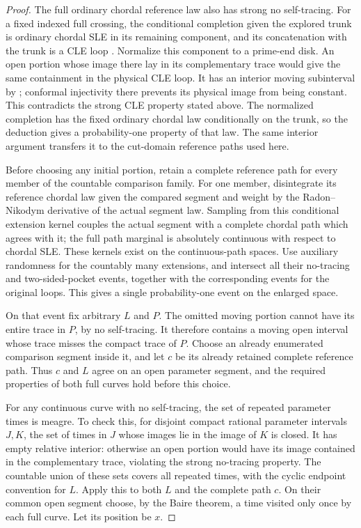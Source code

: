 \begin{proof}
The full ordinary chordal reference law also has strong no self-tracing.
For a fixed indexed full crossing, the conditional completion given
the explored trunk is ordinary chordal SLE in its remaining component,
and its concatenation with the trunk is a CLE loop
\cite[Section~2.3.2]{GwynneMillerQianCLE}.
Normalize this component to a prime-end disk.  An open portion whose
image there lay in its complementary trace would give the same
containment in the physical CLE loop.  It has an interior moving
subinterval by \cite[Proposition~1.7]{YuanLoewnerTraces}; conformal
injectivity there prevents its physical image from being constant.
This contradicts the strong CLE property stated above.  The normalized
completion has the fixed ordinary chordal law conditionally on the
trunk, so the deduction gives a probability-one property of that law.
The same interior argument transfers it to the cut-domain reference
paths used here.

Before choosing any initial portion, retain a complete reference path
for every member of the countable comparison family.  For one member,
disintegrate its reference chordal law given the compared segment and
weight by the Radon--Nikodym derivative of the actual segment law.
Sampling from this conditional extension kernel couples the actual
segment with a complete chordal path which agrees with it; the full
path marginal is absolutely continuous with respect to chordal SLE.
These kernels exist on the continuous-path spaces.  Use auxiliary
randomness for the countably many extensions, and intersect all their
no-tracing and two-sided-pocket events, together with the corresponding
events for the original loops.  This gives a single probability-one
event on the enlarged space.

On that event fix arbitrary $L$ and $P$.  The omitted moving portion
cannot have its entire trace in $P$, by no self-tracing.  It therefore
contains a moving open interval whose trace misses the compact trace
of $P$.  Choose an already enumerated comparison segment inside it,
and let $c$ be its already retained complete reference path.  Thus $c$
and $L$ agree on an open parameter segment, and the required properties
of both full curves hold before this choice.

For any continuous curve with no self-tracing, the set of repeated
parameter times is meagre.  To check this, for disjoint compact rational
parameter intervals $J,K$, the set of times in $J$ whose images lie in
the image of $K$ is closed.  It has empty relative interior: otherwise
an open portion would have its image contained in the complementary trace, violating
the strong no-tracing property.  The countable union of
these sets covers all repeated times, with the cyclic endpoint
convention for $L$.  Apply this to both $L$ and the complete path $c$.
On their common open segment choose, by the Baire theorem, a time
visited only once by each full curve.  Let its position be $x$.


\end{proof}
